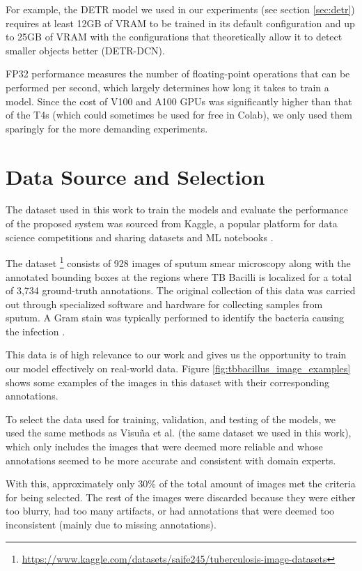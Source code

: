 \documentclass[../main.tex]{subfiles}
\begin{document}
    For example, the DETR model we used in our experiments (see section \ref{sec:detr}) requires at least 12GB of VRAM to be trained in its default configuration and up to 25GB of VRAM with the configurations that theoretically allow it to detect smaller objects better (DETR-DCN).

    FP32 performance measures the number of floating-point operations that can be performed per second, which largely determines how long it takes to train a model. Since the cost of V100 and A100 GPUs was significantly higher than that of the T4s (which could sometimes be used for free in Colab), we only used them sparingly for the more demanding experiments. 
 
 
 \section{Data Source and Selection}

    The dataset used in this work to train the models and evaluate the performance of the proposed system was sourced from Kaggle, a popular platform for data science competitions and sharing datasets and ML notebooks \cite{kaggle}.  
    
    The dataset \footnote{\url{https://www.kaggle.com/datasets/saife245/tuberculosis-image-datasets}} consists of 928 images of sputum smear microscopy along with the annotated bounding boxes at the regions where TB Bacilli is localized for a total of 3,734 ground-truth annotations. The original collection of this data was carried out through specialized software and hardware for collecting samples from sputum. A Gram stain was typically performed to identify the bacteria causing the infection \cite{tbbacillus_kaggle_dataset}.

    This data is of high relevance to our work and gives us the opportunity to train our model effectively on real-world data. Figure \ref{fig:tbbacillus_image_examples} shows some examples of the images in this dataset with their corresponding annotations.

    To select the data used for training, validation, and testing of the models, we used the same methods as Visuña et al. \cite{visuna_novel_2023} (the same dataset we used in this work), which only includes the images that were deemed more reliable and whose annotations seemed to be more accurate and consistent with domain experts.

    With this, approximately only 30\% of the total amount of images met the criteria for being selected. The rest of the images were discarded because they were either too blurry, had too many artifacts, or had annotations that were deemed too inconsistent (mainly due to missing annotations).
\end{document}
